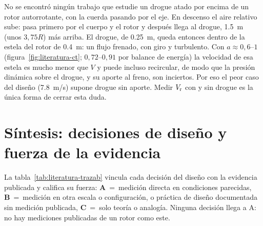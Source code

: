 \begin{nota}
No se encontró ningún trabajo que estudie un drogue atado por encima de un rotor
autorrotante, con la cuerda pasando por el eje. En descenso el aire relativo sube: pasa
primero por el cuerpo y el rotor y después llega al drogue, \SI{1.5}{m} (unos $3{,}75R$)
más arriba. El drogue, de \SI{0.25}{m}, queda entonces dentro de la estela del rotor de
\SI{0.4}{m}: un flujo frenado, con giro y turbulento. Con $a\approx0{,}6$--$1$
(figura~\ref{fig:literatura-ct}; $0{,}72$--$0{,}91$ por balance de energía) la velocidad de esa estela es mucho menor que $V$ y puede
incluso recircular, de modo que la presión dinámica sobre el drogue, y su aporte al
freno, son inciertos. Por eso el peor caso del diseño (\SI{7.8}{m/s}) supone drogue sin
aporte. Medir $V_{\mathrm{r}}$ con y sin drogue es la única forma de cerrar esta duda.
\end{nota}

\section{Síntesis: decisiones de diseño y fuerza de la evidencia}
\label{sec:literatura-sintesis}
La tabla~\ref{tab:literatura-trazab} vincula cada decisión del diseño con la evidencia
publicada y califica su fuerza: \textbf{A}~=~medición directa en condiciones parecidas,
\textbf{B}~=~medición en otra escala o configuración, o práctica de diseño documentada
sin medición publicada, \textbf{C}~=~solo teoría o analogía. Ninguna decisión llega a A:
no hay mediciones publicadas de un rotor como este.

